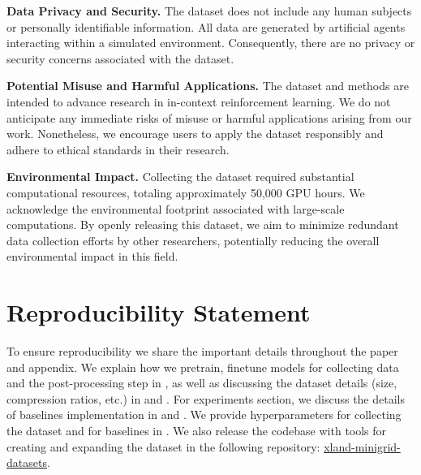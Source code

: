 \documentclass{article}
\begin{document}
\textbf{Data Privacy and Security.} The dataset does not include any human subjects or personally identifiable information. All data are generated by artificial agents interacting within a simulated environment. Consequently, there are no privacy or security concerns associated with the dataset.

\textbf{Potential Misuse and Harmful Applications.} The dataset and methods are intended to advance research in in-context reinforcement learning. We do not anticipate any immediate risks of misuse or harmful applications arising from our work. Nonetheless, we encourage users to apply the dataset responsibly and adhere to ethical standards in their research.

\textbf{Environmental Impact.} Collecting the dataset required substantial computational resources, totaling approximately 50,000 GPU hours. We acknowledge the environmental footprint associated with large-scale computations. By openly releasing this dataset, we aim to minimize redundant data collection efforts by other researchers, potentially reducing the overall environmental impact in this field.

\section*{Reproducibility Statement}
To ensure reproducibility we share the important details throughout the paper and appendix. We explain how we pretrain, finetune models for collecting data and the post-processing step in , as well as discussing the dataset details (size, compression ratios, etc.) in  and . For experiments section, we discuss the details of baselines implementation in  and . We provide hyperparameters for collecting the dataset and for baselines in . We also release the codebase with tools for creating and expanding the dataset in the following repository: \href{https://github.com/dunnolab/xland-minigrid-datasets}{xland-minigrid-datasets}.


\end{document}
